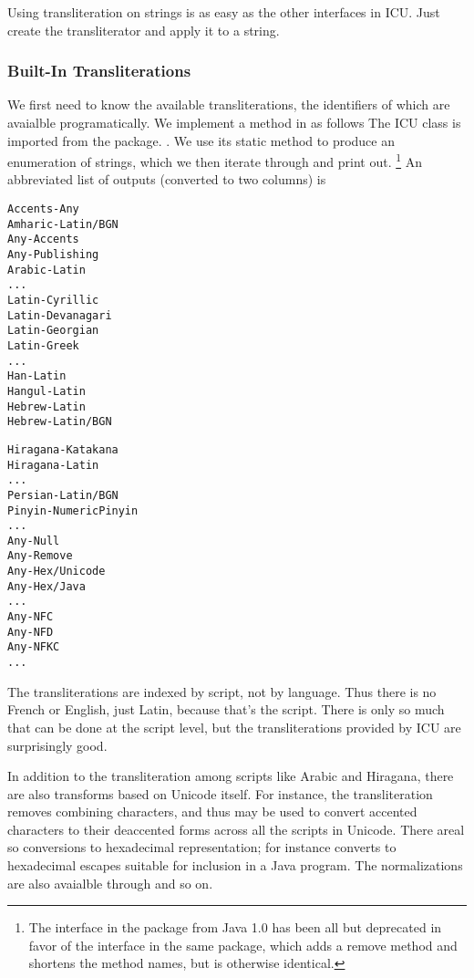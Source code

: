 Using transliteration on strings is as easy as the other interfaces in
ICU.  Just create the transliterator and apply it to a string.  

\subsubsection{Built-In Transliterations}

We first need to know the available transliterations, the identifiers
of which are avaialble programatically.  We implement a 
method in  as follows
%
%
The ICU  class is imported from the package.
.  We use its static method 
to produce an enumeration of strings, which we then iterate through
and print out.%
%
\footnote{The  interface in the package  
from Java 1.0 has been all but deprecated in favor of the
 interface in the same package, which adds a remove
method and shortens the method names, but is otherwise identical.}
%
An abbreviated list of outputs (converted to two columns) is
%
\begin{trivlist}
\item
\begin{minipage}[t]{0.45\textwidth}
\begin{verbatim}
Accents-Any
Amharic-Latin/BGN
Any-Accents
Any-Publishing
Arabic-Latin
...
Latin-Cyrillic
Latin-Devanagari
Latin-Georgian
Latin-Greek
...
Han-Latin
Hangul-Latin
Hebrew-Latin
Hebrew-Latin/BGN
\end{verbatim}
\end{minipage}%
\begin{minipage}[t]{0.45\textwidth}
\begin{verbatim}
Hiragana-Katakana
Hiragana-Latin
...
Persian-Latin/BGN
Pinyin-NumericPinyin
...
Any-Null
Any-Remove
Any-Hex/Unicode
Any-Hex/Java
...
Any-NFC
Any-NFD
Any-NFKC
...
\end{verbatim}
\end{minipage}
\end{trivlist}
%
The transliterations are indexed by script, not by language.  Thus
there is no French or English, just Latin, because that's the script.
There is only so much that can be done at the script level, but the
transliterations provided by ICU are surprisingly good.  

In addition to the transliteration among scripts like Arabic and
Hiragana, there are also transforms based on Unicode itself.  For
instance, the  transliteration removes combining
characters, and thus may be used to convert accented characters to
their deaccented forms across all the scripts in Unicode.  There
areal so conversions to hexadecimal representation; for instance
 converts to hexadecimal  escapes
suitable for inclusion in a Java program.  The normalizations are
also avaialble through  and so on. 

